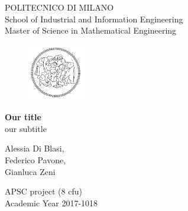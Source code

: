 \thispagestyle{empty}

\vspace*{-1.5cm} \bfseries{
\begin{center}
  \large
  POLITECNICO DI MILANO\\
  \normalsize
  School of Industrial and Information Engineering\\
  Master of Science in Mathematical Engineering\\
  \begin{figure}[htbp]
    \begin{center}
      \includegraphics[width=2.5cm]{./pictures/logopoli.png}
    \end{center}
  \end{figure}
  \vspace*{1.5cm} \LARGE



  \textbf{Our title}\\



  \vspace*{.75truecm} \Large
  our subtitle \\
  
  \vspace*{3.75truecm} \large
  
    Alessia Di Blasi,\\
    Federico Pavone,\\
    Gianluca Zeni
  
  
  \vspace*{2.75cm} \large

  APSC project (8 cfu) \\

  \vspace*{1.0truecm} \large
  Academic Year 2017-1018
  
\end{center} 
}
